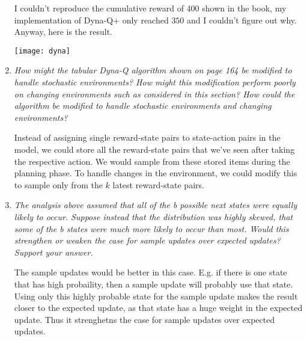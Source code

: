 \documentclass[12pt,a4paper]{article}
\begin{document}
\begin{enumerate}
    I couldn't reproduce the cumulative reward of $400$ shown in the book, my
    implementation of Dyna-Q+ only reached $350$ and I couldn't figure out why.
    Anyway, here is the result.

    \begin{center}
    \texttt{[image: dyna]}
    \end{center}

  \item
    \textit{How might the tabular Dyna-Q algorithm shown on page 164 be modified
    to handle stochastic environments? How might this modification perform poorly on
    changing environments such as considered in this section? How could the algorithm be
    modified to handle stochastic environments and changing environments?}

    Instead of assigning single reward-state pairs to state-action pairs in the model,
    we could store all the reward-state pairs that we've seen after taking the
    respective action. We would sample from these stored items during the planning
    phase. To handle changes in the environment, we could modify this to sample
    only from the $k$ latest reward-state pairs.

  \item
    \textit{The analysis above assumed that all of the b possible next states were
    equally likely to occur. Suppose instead that the distribution was highly skewed, that
    some of the b states were much more likely to occur than most. Would this strengthen or
    weaken the case for sample updates over expected updates? Support your answer.}

    The sample updates would be better in this case. E.g. if there is one state
    that has high probaility, then a sample update will probably use that state.
    Using only this highly probable state for the sample update makes the result closer
    to the expected update, as that state has a huge weight in the expected update.
    Thus it strenghetns the case for sample updates over expected updates.



\end{enumerate}
\end{document}
